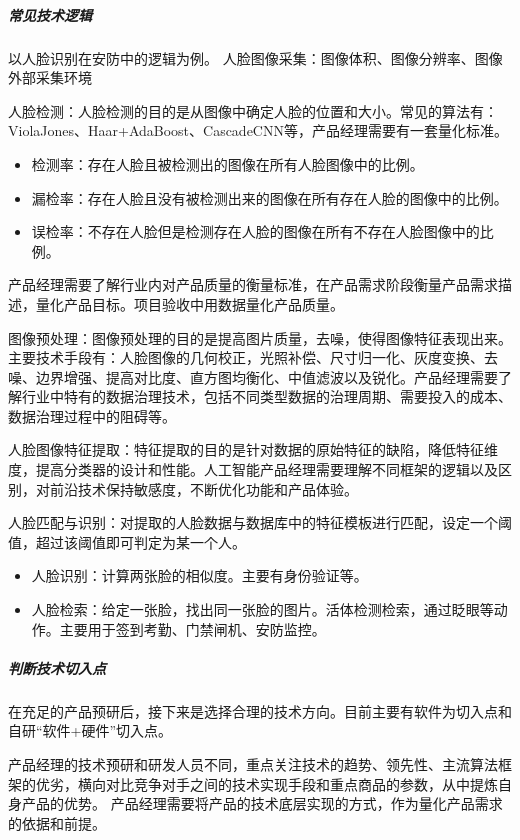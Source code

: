 \documentclass[letterpaper,10pt,english]{sphinxmanual}
\begin{document}
\subparagraph{常见技术逻辑}
\label{\detokenize{chapter_idea/understand_tech:id37}}
以人脸识别在安防中的逻辑为例。
人脸图像采集：图像体积、图像分辨率、图像外部采集环境

人脸检测：人脸检测的目的是从图像中确定人脸的位置和大小。常见的算法有：Viola\sphinxhyphen{}Jones、Haar+AdaBoost、CascadeCNN等，产品经理需要有一套量化标准。
\begin{itemize}
\item {} 
检测率：存在人脸且被检测出的图像在所有人脸图像中的比例。

\item {} 
漏检率：存在人脸且没有被检测出来的图像在所有存在人脸的图像中的比例。

\item {} 
误检率：不存在人脸但是检测存在人脸的图像在所有不存在人脸图像中的比例。

\end{itemize}

产品经理需要了解行业内对产品质量的衡量标准，在产品需求阶段衡量产品需求描述，量化产品目标。项目验收中用数据量化产品质量。

图像预处理：图像预处理的目的是提高图片质量，去噪，使得图像特征表现出来。主要技术手段有：人脸图像的几何校正，光照补偿、尺寸归一化、灰度变换、去噪、边界增强、提高对比度、直方图均衡化、中值滤波以及锐化。产品经理需要了解行业中特有的数据治理技术，包括不同类型数据的治理周期、需要投入的成本、数据治理过程中的阻碍等。

人脸图像特征提取：特征提取的目的是针对数据的原始特征的缺陷，降低特征维度，提高分类器的设计和性能。人工智能产品经理需要理解不同框架的逻辑以及区别，对前沿技术保持敏感度，不断优化功能和产品体验。

人脸匹配与识别：对提取的人脸数据与数据库中的特征模板进行匹配，设定一个阈值，超过该阈值即可判定为某一个人。
\begin{itemize}
\item {} 
人脸识别：计算两张脸的相似度。主要有身份验证等。

\item {} 
人脸检索：给定一张脸，找出同一张脸的图片。活体检测检索，通过眨眼等动作。主要用于签到考勤、门禁闸机、安防监控。

\end{itemize}


\subparagraph{判断技术切入点}
\label{\detokenize{chapter_idea/understand_tech:id38}}
在充足的产品预研后，接下来是选择合理的技术方向。目前主要有软件为切入点和自研“软件+硬件”切入点。

产品经理的技术预研和研发人员不同，重点关注技术的趋势、领先性、主流算法框架的优劣，横向对比竞争对手之间的技术实现手段和重点商品的参数，从中提炼自身产品的优势。
产品经理需要将产品的技术底层实现的方式，作为量化产品需求的依据和前提。
\end{document}
